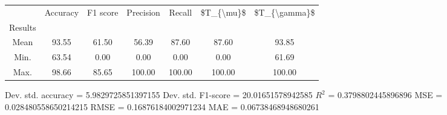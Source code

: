 \begin{tabular}{|c|c|c|c|c|c|c|}
\toprule
{} &  Accuracy &  F1 score &  Precision &  Recall &  \$T\_\{\textbackslash mu\}\$ &  \$T\_\{\textbackslash gamma\}\$ \\
Results &           &           &            &         &            &               \\
\hline
Mean    &     93.55 &     61.50 &      56.39 &   87.60 &      87.60 &         93.85 \\
Min.    &     63.54 &      0.00 &       0.00 &    0.00 &       0.00 &         61.69 \\
Max.    &     98.66 &     85.65 &     100.00 &  100.00 &     100.00 &        100.00 \\
\bottomrule
\end{tabular}

 Dev. std. accuracy = 5.9829725851397155
 Dev. std. F1-score = 20.01651578942585
 $R^2$ = 0.3798802445896896
 MSE = 0.028480558650214215
 RMSE = 0.16876184002971234
 MAE = 0.06738468948680261